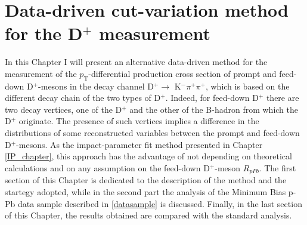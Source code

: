 \documentclass[b5paper,10pt,twoside,oldstyle,classica]{toptesi}
\newcommand{\pt}{p_\text{T}}
\begin{document}
\chapter{Data-driven cut-variation method for the D$^+$ measurement}
\label{CV_chapter}
In this Chapter I will present an alternative data-driven method for the measurement of the $\pt$-differential production cross section of prompt and feed-down D$^+$-mesons in the decay channel D$^+\rightarrow$ K$^-\pi^+\pi^+$, which is based on the different decay chain of the two types of D$^+$. Indeed, for feed-down D$^+$ there are two decay vertices, one of the D$^+$ and the other of the B-hadron from which the D$^+$ originate. The presence of such vertices implies a difference in the distributions of some reconstructed variables between the prompt and feed-down D$^+$-mesons. As the impact-parameter fit method presented in Chapter \ref{IP_chapter}, this approach has the advantage of not depending on theoretical calculations and on any assumption on the feed-down D$^+$-meson $R_{pPb}$. The first section of this Chapter is dedicated to the description of the method and the startegy adopted, while in the second part the analysis of the Minimum Bias p-Pb data sample described in \ref{datasample} is discussed. Finally, in the last section of this Chapter, the results obtained are compared with the standard analysis.  
\end{document}
